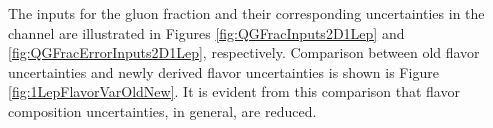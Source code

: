 The inputs for the gluon fraction and their corresponding uncertainties in the \olep channel are illustrated in Figures \ref{fig:QGFracInputs2D1Lep} and \ref{fig:QGFracErrorInputs2D1Lep}, respectively. 
Comparison between old flavor uncertainties and newly derived flavor uncertainties is shown is Figure \ref{fig:1LepFlavorVarOldNew}. It is evident from this comparison that flavor composition uncertainties, in general, are reduced.


